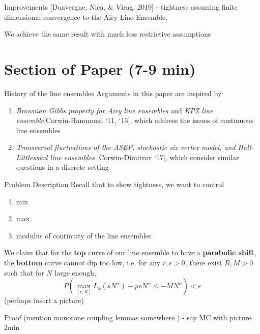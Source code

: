 \documentclass[9pt,t,dvipsnames]{beamer}
\begin{document}
\begin{frame}{Improvements}
[Duavergne, Nica, \& Virag, 2019] - tightness assuming finite dimensional convergence to the Airy Line Ensemble. 

We achieve the same result with much less restrictive assumptions
\newline\newline{}
\end{frame}


\section{Section of Paper (7-9 min)}

\begin{frame} {History of the line ensembles}
	Arguments in this paper are inspired by 
	\begin{enumerate}
		\item \textit{Brownian Gibbs property for Airy line ensembles} and \textit{KPZ line ensemble}[Corwin-Hammond ‘11, ‘13], which address the issues of {\color{red}continuous} line ensembles
		\item \textit{Transversal fluctuations of the ASEP, stochastic six vertex model, and Hall-Littlewood line ensembles} [Corwin-Dimitrov ‘17], which consider similar questions in a {\color{red}discrete} setting 
	\end{enumerate}
\end{frame}
\begin{frame}{Problem Description}
	Recall that to show tightness, we want to control \begin{enumerate}
		\item \begin{center}
			min
		\end{center}
		\item 
		\begin{center}
			max
		\end{center}
		\item 
		\begin{center}
			modulus of continuity of the line ensembles
		\end{center}
	\end{enumerate}
	We claim that for the {\color{blue}\textbf{top}} curve of our line ensemble to have a {\color{red}\textbf{parabolic shift}}, the {\color{blue}\textbf{bottom}} curve cannot dip too low, i.e. for any $r, \epsilon > 0$, there exist $R, M > 0$ such that for $N$ large enough,
	$$P( \max_{[r, R]} L_k(sN^{\alpha}) - psN^{\alpha} \leq -MN^{\alpha} ) < \epsilon$$ 
	(perhaps insert a picture)
\end{frame}
\begin{frame}
Proof  (mention monotone coupling lemmas somewhere ) - say MC with picture
2min
\end{frame}
\end{document}
